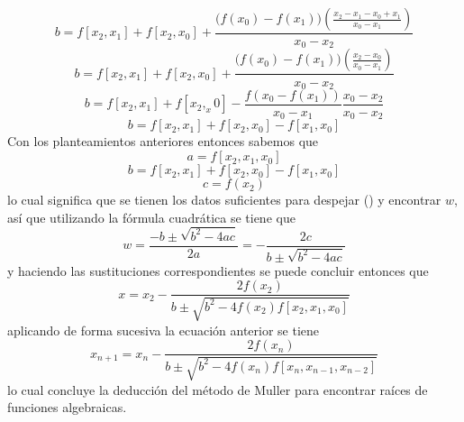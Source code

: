 \begin{equation*}
    b=f[x_2,x_1]+f[x_2,x_0]+\frac{\bigl(f(x_0)-f(x_1)\bigr)\left(\frac{x_2-x_1-x_0+x_1}{x_0-x_1}\right)}{x_0-x_2}
\end{equation*}
\begin{equation*}
    b=f[x_2,x_1]+f[x_2,x_0]+\frac{\bigl(f(x_0)-f(x_1)\bigr)\left(\frac{x_2-x_0}{x_0-x_1}\right)}{x_0-x_2}
\end{equation*}
\begin{equation*}
    b=f[x_2,x_1]+f[x_2,_x0]-\frac{f(x_0-f(x_1))}{x_0-x_1}\frac{x_0-x_2}{x_0-x_2}
\end{equation*}
\begin{equation}
    \label{eq6_muller}
    b=f[x_2,x_1]+f[x_2,x_0]-f[x_1,x_0]
\end{equation}
Con los planteamientos anteriores entonces sabemos que
\begin{equation*}
    a=f[x_2,x_1,x_0]
\end{equation*}
\begin{equation*}
    b=f[x_2,x_1]+f[x_2,x_0]-f[x_1,x_0]
\end{equation*}
\begin{equation*}
    c=f(x_2)
\end{equation*}
lo cual significa que se tienen los datos suficientes para despejar ()
y encontrar $w$, así que utilizando la fórmula cuadrática se tiene que
\begin{equation*}
    w=\frac{-b\pm\sqrt{b^2-4ac}}{2a}=-\frac{2c}{b\pm\sqrt{b^2-4ac}}
\end{equation*}
y haciendo las sustituciones correspondientes se puede concluir entonces que
\begin{equation*}
    x=x_2-\frac{2f(x_2)}{b\pm\sqrt{b^2-4f(x_2)f[x_2,x_1,x_0]}}
\end{equation*}
aplicando de forma sucesiva la ecuación anterior se tiene
\begin{equation}
    \label{muller_algorithm}
    x_{n+1}=x_n-\frac{2f(x_n)}{b\pm\sqrt{b^2-4f(x_n)f[x_n,x_{n-1},x_{n-2}]}}
\end{equation}
lo cual concluye la deducción del método de Muller para encontrar
raíces de funciones algebraicas.